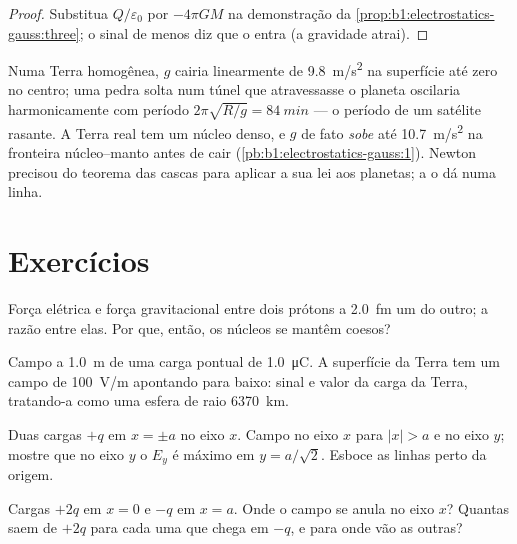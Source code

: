 \begin{proof}
Substitua $Q/\varepsilon_0$ por $-4\pi GM$ na demonstração da
\cref{prop:b1:electrostatics-gauss:three}; o sinal de menos diz que o 
entra (a gravidade atrai).
\end{proof}

\begin{example}\label{ex:b1:electrostatics-gauss:earth}
Numa Terra homogênea, $g$ cairia linearmente de \qty{9.8}{m/s^2} na
superfície até zero no centro; uma pedra solta num túnel que atravessasse
o planeta oscilaria harmonicamente com período $2\pi\sqrt{R/g} =
\qty{84}{min}$ --- o período de um satélite rasante. A Terra real tem
um núcleo denso, e $g$ de fato \emph{sobe} até \qty{10.7}{m/s^2} na
fronteira núcleo--manto antes de cair (\cref{pb:b1:electrostatics-gauss:1}).
Newton precisou do teorema das cascas para aplicar a sua lei aos planetas; a  o dá numa linha.
\end{example}

\section{Exercícios}

\begin{exercise}[$\star$]\label{exo:b1:electrostatics-gauss:1}
Força elétrica e força gravitacional entre dois prótons a
\qty{2.0}{fm} um do outro; a razão entre elas. Por que, então, os núcleos se mantêm coesos?
\end{exercise}

\begin{exercise}[$\star$]\label{exo:b1:electrostatics-gauss:2}
Campo a \qty{1.0}{m} de uma carga pontual de \qty{1.0}{\micro C}. A superfície
da Terra tem um campo de \qty{100}{V/m} apontando para baixo: sinal e valor da
carga da Terra, tratando-a como uma esfera de raio \qty{6370}{km}.
\end{exercise}

\begin{exercise}[$\star$]\label{exo:b1:electrostatics-gauss:3}
Duas cargas $+q$ em $x = \pm a$ no eixo $x$. Campo no eixo $x$
para $|x| > a$ e no eixo $y$; mostre que no eixo $y$ o $E_y$ é
máximo em $y = a/\sqrt2$. Esboce as linhas perto da origem.
\end{exercise}

\begin{exercise}[$\star$]\label{exo:b1:electrostatics-gauss:4}
Cargas $+2q$ em $x = 0$ e $-q$ em $x = a$. Onde o campo se anula no
eixo $x$? Quantas  saem de $+2q$ para cada uma que
chega em $-q$, e para onde vão as outras?
\end{exercise}


